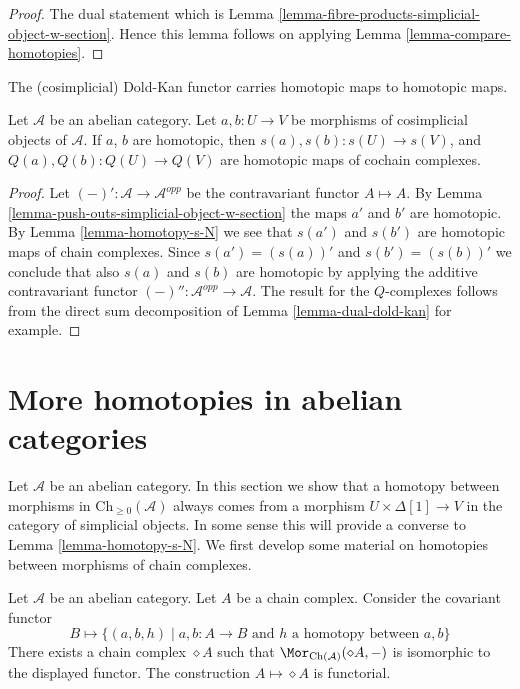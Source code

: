 \begin{proof}
The dual statement which is
Lemma \ref{lemma-fibre-products-simplicial-object-w-section}.
Hence this lemma follows on applying
Lemma \ref{lemma-compare-homotopies}.
\end{proof}

\begin{lemma}
\label{lemma-homotopy-s-Q}
\begin{slogan}
The (cosimplicial) Dold-Kan functor carries homotopic maps to homotopic maps.
\end{slogan}
Let $\mathcal{A}$ be an abelian category.
Let $a, b : U \to V$ be morphisms of cosimplicial
objects of $\mathcal{A}$. If $a$, $b$ are homotopic,
then $s(a), s(b) : s(U) \to s(V)$, and
$Q(a), Q(b) : Q(U) \to Q(V)$ are homotopic maps
of cochain complexes.
\end{lemma}

\begin{proof}
Let $(-)' : \mathcal{A} \to \mathcal{A}^{opp}$
be the contravariant functor $A \mapsto A$.
By
Lemma \ref{lemma-push-outs-simplicial-object-w-section}
the maps $a'$ and $b'$ are homotopic.
By Lemma \ref{lemma-homotopy-s-N} we see that
$s(a')$ and $s(b')$ are homotopic maps of chain
complexes. Since $s(a') = (s(a))'$ and
$s(b') = (s(b))'$ we conclude that also
$s(a)$ and $s(b)$ are homotopic by applying
the additive
contravariant functor $(-)'' : \mathcal{A}^{opp} \to \mathcal{A}$.
The result for the $Q$-complexes follows from the direct sum decomposition of
Lemma \ref{lemma-dual-dold-kan} for example.
\end{proof}




\section{More homotopies in abelian categories}
\label{section-backwards-homotopy}

\noindent
Let $\mathcal{A}$ be an abelian category.
In this section we show that a homotopy between
morphisms in $\text{Ch}_{\geq 0}(\mathcal{A})$
always comes from a morphism $U \times \Delta[1] \to V$
in the category of simplicial objects. In some sense
this will provide a converse to Lemma \ref{lemma-homotopy-s-N}.
We first develop some material on homotopies between morphisms
of chain complexes.

\begin{lemma}
\label{lemma-represent-homotopy}
Let $\mathcal{A}$ be an abelian category.
Let $A$ be a chain complex.
Consider the covariant functor
$$
B \longmapsto
\{
(a, b, h)
\mid
a, b : A \to B\text{ and }h\text{ a homotopy between }a, b
\}
$$
There exists a chain complex $\diamond A$
such that $\Mor_{\text{Ch}(\mathcal{A})}(\diamond A, -)$
is isomorphic to the displayed functor.
The construction $A \mapsto \diamond A$ is functorial.
\end{lemma}


